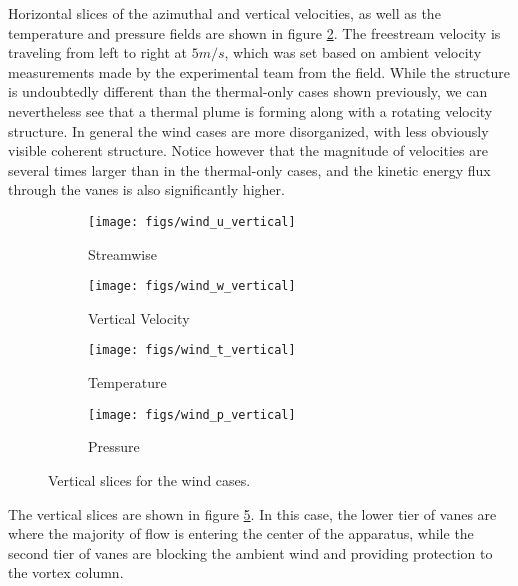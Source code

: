 Horizontal slices of the azimuthal and vertical velocities, as well as the 
temperature and pressure fields are shown in figure \ref{fig:vz-wind-vert}. The freestream velocity
is traveling from left to right at $5 m/s$, which was set based on ambient velocity measurements made by 
the experimental team from the field. 
While the structure is undoubtedly different than the thermal-only cases shown previously, 
we can nevertheless see that a thermal plume is forming along with a 
rotating velocity structure. In general the wind cases are more disorganized, with less obviously 
visible coherent structure. Notice however that the magnitude of velocities are several times larger than 
in the thermal-only cases, and the kinetic energy flux through the vanes is also significantly higher. 

%
%
\begin{figure}[htb]

 \begin{subfigure}{.5\textwidth}
  \centering
  \texttt{[image: figs/wind\_u\_vertical]}
  \caption{Streamwise}
  \label{fig:vt-wind-vert}
 \end{subfigure}%
 \begin{subfigure}{.5\textwidth}
  \centering
  \texttt{[image: figs/wind\_w\_vertical]}
  \caption{Vertical Velocity}
  \label{fig:vz-wind-vert}
 \end{subfigure}%


 \begin{subfigure}{.5\textwidth}
  \centering
  \texttt{[image: figs/wind\_t\_vertical]}
  \caption{Temperature}
  \label{fig:t-wind-vert}
 \end{subfigure}%
 \begin{subfigure}{.5\textwidth}
  \centering
  \texttt{[image: figs/wind\_p\_vertical]}
  \caption{Pressure}
  \label{fig:p-wind-vert}
 \end{subfigure}%

 \caption{Vertical slices for the wind cases.}
 \label{fig:wind-ver}
\end{figure}

The vertical slices are shown in figure \ref{fig:wind-ver}. In this
case, the lower tier of vanes are where the majority of flow is 
entering the center of the apparatus, while the second tier of vanes are
blocking the ambient wind and providing protection to the vortex column. 

